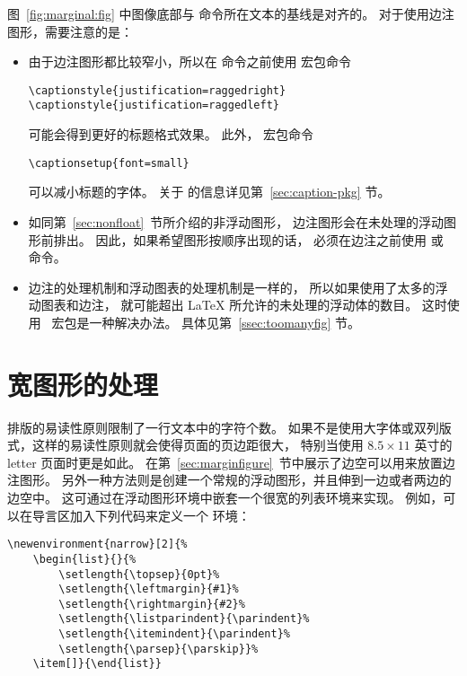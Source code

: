 图~\ref{fig:marginal:fig} 中图像底部与  命令所在文本的基线是对齐的。
对于使用边注图形，需要注意的是：
\begin{itemize}	
	\item 由于边注图形都比较窄小，所以在  命令之前使用  宏包命令
\begin{lstlisting}
\captionstyle{justification=raggedright}
\captionstyle{justification=raggedleft}
\end{lstlisting}
	可能会得到更好的标题格式效果。
	此外， 宏包命令
\begin{lstlisting}
\captionsetup{font=small}
\end{lstlisting}
	可以减小标题的字体。
	关于  的信息详见第~\ref{sec:caption-pkg} 节。
	
	\item 如同第~\ref{sec:nonfloat}~节所介绍的非浮动图形，
	边注图形会在未处理的浮动图形前排出。
	因此，如果希望图形按顺序出现的话，
	必须在边注之前使用  或  命令。
	
	\item 边注的处理机制和浮动图表的处理机制是一样的，
	所以如果使用了太多的浮动图表和边注，
	就可能超出 \LaTeX{} 所允许的未处理的浮动体的数目。
	这时使用 ~宏包是一种解决办法。
	具体见第~\ref{ssec:toomanyfig} 节。
\end{itemize}      

\section{宽图形的处理} \label{sec:widefig}

排版的易读性原则限制了一行文本中的字符个数。
如果不是使用大字体或双列版式，这样的易读性原则就会使得页面的页边距很大，
特别当使用 $8.5\times 11 $ 英寸的 letter 页面时更是如此。
在第~\ref{sec:marginfigure}~节中展示了边空可以用来放置边注图形。
另外一种方法则是创建一个常规的浮动图形，并且伸到一边或者两边的边空中。
这可通过在浮动图形环境中嵌套一个很宽的列表环境来实现。
例如，可以在导言区加入下列代码来定义一个  环境：
\begin{lstlisting}
\newenvironment{narrow}[2]{%
	\begin{list}{}{%
		\setlength{\topsep}{0pt}%
		\setlength{\leftmargin}{#1}%
		\setlength{\rightmargin}{#2}%
		\setlength{\listparindent}{\parindent}%
		\setlength{\itemindent}{\parindent}%
		\setlength{\parsep}{\parskip}}%
	\item[]}{\end{list}}
\end{lstlisting}

